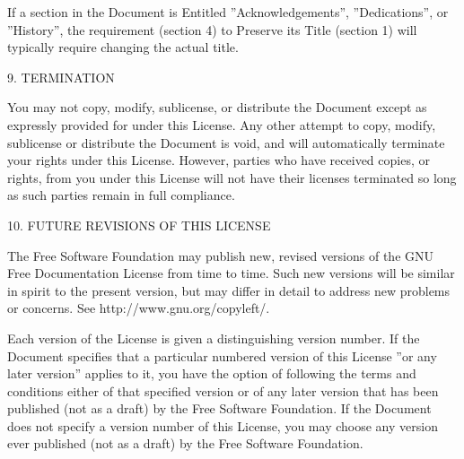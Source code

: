 If a section in the Document is Entitled ''Acknowledgements'', ''Dedications'', or ''History'', the requirement
(section 4) to Preserve its Title (section 1) will typically require changing the actual title.

9. TERMINATION

You may not copy, modify, sublicense, or distribute the Document except as expressly provided for under this License.
Any other attempt to copy, modify, sublicense or distribute the Document is void, and will automatically terminate your
rights under this License. However, parties who have received copies, or rights, from you under this License will not
have their licenses terminated so long as such parties remain in full compliance.

10. FUTURE REVISIONS OF THIS LICENSE

The Free Software Foundation may publish new, revised versions of the GNU Free Documentation License from time to time.
Such new versions will be similar in spirit to the present version, but may differ in detail to address new problems or
concerns. See http://www.gnu.org/copyleft/.

Each version of the License is given a distinguishing version number. If the Document specifies that a particular
numbered version of this License ''or any later version'' applies to it, you have the option of following the terms and
conditions either of that specified version or of any later version that has been published (not as a draft) by the
Free Software Foundation. If the Document does not specify a version number of this License, you may choose any version
ever published (not as a draft) by the Free Software Foundation.

\clearpage
